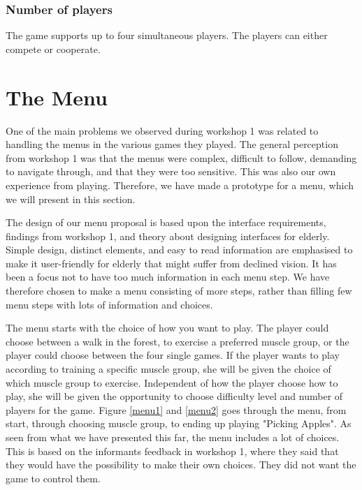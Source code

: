 \subsubsection{Number of players} 
The game supports up to four simultaneous players. The players can either compete or cooperate. 

\section{The Menu}
\label{sec:menu}

One of the main problems we observed during workshop 1 was related to handling the menus in the various games they played. The general perception from workshop 1 was that the menus were complex, difficult to follow, demanding to navigate through, and that they were too sensitive. This was also our own experience from playing. Therefore, we have made a prototype for a menu, which we will present in this section.

The design of our menu proposal is based upon the interface requirements, findings from workshop 1, and theory about designing interfaces for elderly. Simple design, distinct elements, and easy to read information are emphasised to make it user-friendly for elderly that might suffer from declined vision. It has been a focus not to have too much information in each menu step. We have therefore chosen to make a menu consisting of more steps, rather than filling few menu steps with lots of information and choices.   

The menu starts with the choice of how you want to play. The player could choose between a walk in the forest, to exercise a preferred muscle group, or the player could choose between the four single games. If the player wants to play according to training a specific muscle group, she will be given the choice of which muscle group to exercise. Independent of how the player choose how to play, she will be given the opportunity to choose difficulty level and number of players for the game. Figure \ref{menu1} and \ref{menu2} goes through the menu, from start, through choosing muscle group, to ending up playing "Picking Apples". As seen from what we have presented this far, the menu includes a lot of choices. This is based on the informants feedback in workshop 1, where they said that they would have the possibility to make their own choices. They did not want the game to control them.   

